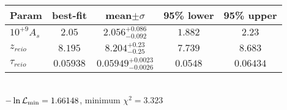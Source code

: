 \begin{tabular}{|l|c|c|c|c|} 
 \hline 
Param & best-fit & mean$\pm\sigma$ & 95\% lower & 95\% upper \\ \hline 
$10^{+9}A_{s }$ &$2.05$ & $2.056_{-0.092}^{+0.086}$ & $1.882$ & $2.23$ \\ 
$z_{reio }$ &$8.195$ & $8.204_{-0.25}^{+0.23}$ & $7.739$ & $8.683$ \\ 
$\tau{}_{reio }$ &$0.05938$ & $0.05949_{-0.0026}^{+0.0023}$ & $0.0548$ & $0.06434$ \\ 
\hline 
 \end{tabular} \\ 
$-\ln{\cal L}_\mathrm{min} =1.66148$, minimum $\chi^2=3.323$ \\ 
